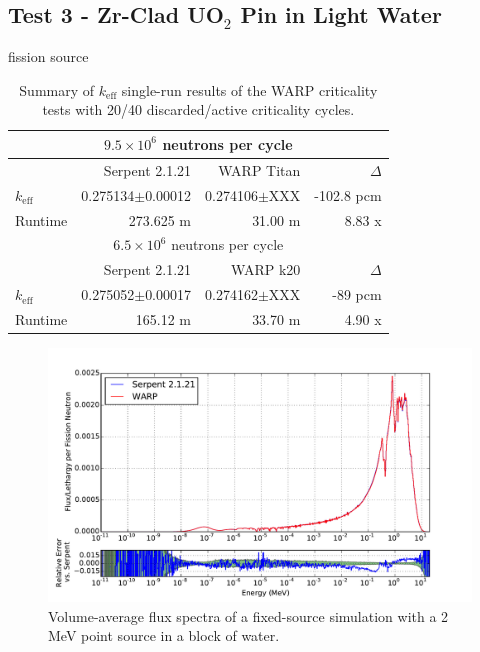 \documentclass[preprint,12pt]{elsarticle}
\begin{document}
\subsection{Test 3 - Zr-Clad UO$_2$ Pin in Light Water}

fission source

\begin{table}[h]
\centering
\caption{Summary of $k_\mathrm{eff}$ single-run results of the WARP criticality tests with 20/40 discarded/active criticality cycles.}
\label{pincell_table}
\small
\begin{tabular}{| l | r | r | r |}
\hline
\multicolumn{4}{|c|}{$9.5\times10^6$ neutrons per cycle} \\
\hline
                  & Serpent 2.1.21       & WARP Titan               & $\Delta$ \\
\hline
$k_\mathrm{eff}$  & 0.275134$\pm$0.00012 & 0.274106$\pm$XXX         & -102.8 pcm \\
\hline
Runtime           & 273.625 m            & 31.00 m                  & 8.83 x \\
\hline
\hline
\multicolumn{4}{|c|}{$6.5\times10^6$ neutrons per cycle} \\
\hline
                  & Serpent 2.1.21       & WARP k20            & $\Delta$ \\
\hline
$k_\mathrm{eff}$  & 0.275052$\pm$0.00017 & 0.274162$\pm$XXX    & -89 pcm \\
\hline
Runtime           & 165.12 m             & 33.70 m             & 4.90 x\\
\hline
\end{tabular}
\end{table}


\begin{figure}[h!]
\centering
\includegraphics[width=\textwidth,trim= 1cm 0cm 1cm 0cm]{graphics/pincell_spec.pdf}
\caption{Volume-average flux spectra of a fixed-source simulation with a 2 MeV point source in a block of water. \label{pincell_spec} }
\end{figure}
\end{document}
